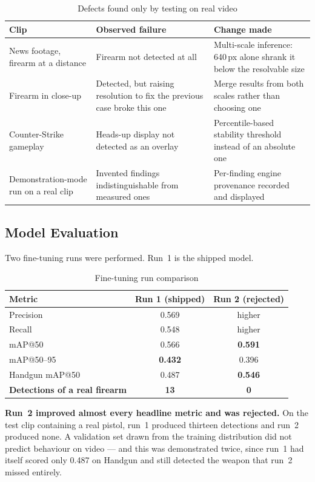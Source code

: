 \documentclass[
12pt,
a4paper,
oneside
]{report}
\begin{document}
\begin{table}[H]
\centering
\small
\begin{tabular}{|p{3.4cm}|p{4.4cm}|p{5cm}|}
\hline
\textbf{Clip} & \textbf{Observed failure} & \textbf{Change made} \\
\hline
News footage, firearm at a distance & Firearm not detected at all & Multi-scale
inference: 640\,px alone shrank it below the resolvable size \\
\hline
Firearm in close-up & Detected, but raising resolution to fix the previous case
broke this one & Merge results from both scales rather than choosing one \\
\hline
Counter-Strike gameplay & Heads-up display not detected as an overlay &
Percentile-based stability threshold instead of an absolute one \\
\hline
Demonstration-mode run on a real clip & Invented findings indistinguishable from
measured ones & Per-finding engine provenance recorded and displayed \\
\hline
\end{tabular}
\caption{Defects found only by testing on real video}
\end{table}

\subsection{Model Evaluation}
\label{sec:runtwo}

Two fine-tuning runs were performed. Run~1 is the shipped model.

\begin{table}[H]
\centering
\begin{tabular}{|p{4cm}|c|c|}
\hline
\textbf{Metric} & \textbf{Run 1 (shipped)} & \textbf{Run 2 (rejected)} \\
\hline
Precision & 0.569 & higher \\
\hline
Recall & 0.548 & higher \\
\hline
mAP@50 & 0.566 & \textbf{0.591} \\
\hline
mAP@50--95 & \textbf{0.432} & 0.396 \\
\hline
Handgun mAP@50 & 0.487 & \textbf{0.546} \\
\hline
\textbf{Detections of a real firearm} & \textbf{13} & \textbf{0} \\
\hline
\end{tabular}
\caption{Fine-tuning run comparison}
\end{table}

\textbf{Run~2 improved almost every headline metric and was rejected.} On the
test clip containing a real pistol, run~1 produced thirteen detections and run~2
produced none. A validation set drawn from the training distribution did not
predict behaviour on video --- and this was demonstrated twice, since run~1 had
itself scored only 0.487 on Handgun and still detected the weapon that run~2
missed entirely.
\end{document}
